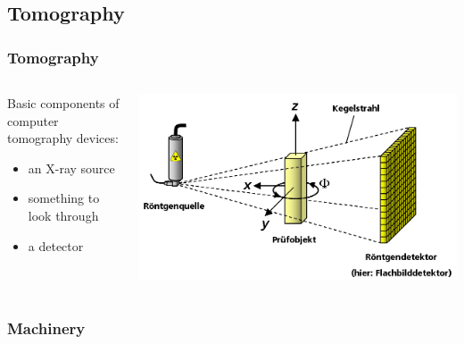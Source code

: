 \subsection{Tomography}
\begin{frame}
	\frametitle{Tomography}
	\begin{columns}%
		\begin{column}{0.3822\linewidth}%
			Basic components of computer tomography devices:
			\begin{itemize}
				\item an X-ray source
				\item something to look through
				\item a detector
			\end{itemize}
		\end{column}%
		\begin{column}{0.6177\linewidth}%
			\centering%
			\includegraphics[width=\imagewidth]{./images/3D_Computed_Tomography}%
		\end{column}%
	\end{columns}%
\end{frame}

\begin{frame}
	\frametitle{Machinery}
	\begin{columns}
		\begin{column}{0.5\textwidth}
			\centering%
			\pause%
		\end{column}%
		\begin{column}{0.5\textwidth}%
			\centering%
			\only<3|handout:1>{}%
			\only<1-2|handout:1>{}%
			\only<4|handout:1>{}%
		\end{column}
	\end{columns}
\end{frame}

